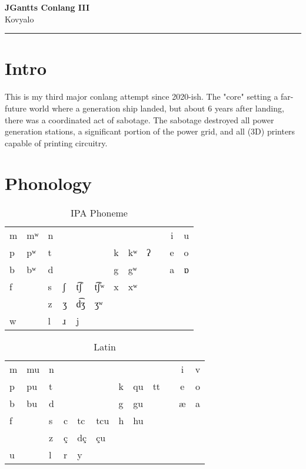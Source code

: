 \documentclass[11pt]{article}
\newcommand{\customtitle}[1]{
    \begin{center}
        \vspace*{2cm}
        {\Huge\bfseries\color{primary} #1}\\
        \vspace{0.5cm}
        {\Large Kovyalo}\\
        \vspace{1cm}
    \end{center}
    \vspace{1cm}
    \hrule
    \vspace{1cm}
}
\begin{document}
\pagecolor{background}

\customtitle{JGantts Conlang III}

\section{Intro}
This is my third major conlang attempt since 2020-ish.
The "core" setting a far-future world where a generation ship landed,
but about 6 years after landing, there was a coordinated act of sabotage.
The sabotage destroyed all power generation stations, a significant portion
of the power grid, and all (3D) printers capable of printing circuitry.

\section{Phonology}

\begin{table}[H]
\begin{center}
\caption{IPA Phoneme}
\label{table-phonemes-ipa}
\begin{tabular}{l l l l l l l l l l c c}
 m & mʷ & n & & & &   &    &   & & i & u \\
 p & pʷ & t & & & & k & kʷ & ʔ & & e & o \\
 b & bʷ & d & & & & g & gʷ &   & & a & ɒ \\
 f & & s & ʃ & t͡ʃ & t͡ʃʷ & x & xʷ & & &  \\
 & & z & ʒ & d͡ʒ & ʒʷ & & & & & \\
 w & & l & ɹ & j & & & & \\
\end{tabular}
\end{center}
\end{table}

\begin{table}[H]
\begin{center}
\caption{Latin}
\label{table-phonemes-latin}
\begin{tabular}{l l l l l l l l l l c c}
 m & mu & n & & & &   &    &    & & i & v \\
 p & pu & t & & & & k & qu & tt & & e & o \\
 b & bu & d & & & & g & gu &    & & æ & a \\
 f & & s & c & tc & tcu & h & hu & & & \\
 & & z & ç & dç & çu & & & & & \\
 u & & l & r & y & & & & \\
\end{tabular}
\end{center}
\end{table}
\end{document}
